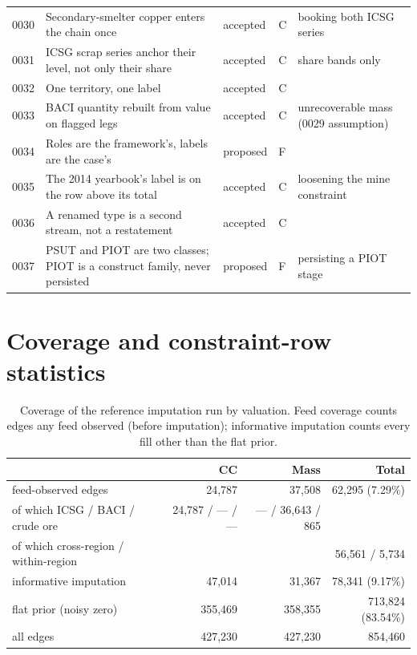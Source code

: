 \documentclass[11pt]{article}
\begin{document}
\begin{longtable}{@{}p{0.9cm}p{7.6cm}p{2.9cm}p{0.5cm}p{2.9cm}@{}}
0030 & Secondary-smelter copper enters the chain once & accepted & C & booking both ICSG series \\
0031 & ICSG scrap series anchor their level, not only their share & accepted & C & share bands only \\
0032 & One territory, one label & accepted & C & \\
0033 & BACI quantity rebuilt from value on flagged legs & accepted & C & unrecoverable mass (0029 assumption) \\
0034 & Roles are the framework's, labels are the case's & proposed & F & \\
0035 & The 2014 yearbook's label is on the row above its total & accepted & C & loosening the mine constraint \\
0036 & A renamed type is a second stream, not a restatement & accepted & C & \\
0037 & PSUT and PIOT are two classes; PIOT is a construct family, never persisted & proposed & F & persisting a PIOT stage \\
\bottomrule
\end{longtable}

\section{Coverage and constraint-row statistics}\label{si:coverage}

\begin{table}[h]
\centering\small
\begin{tabular}{@{}lrrr@{}}
\toprule
& CC & Mass & Total \\
\midrule
feed-observed edges & 24{,}787 & 37{,}508 & 62{,}295 (7.29\%) \\
\quad of which ICSG / BACI / crude ore & 24{,}787 / --- / --- & --- / 36{,}643 / 865 & \\
\quad of which cross-region / within-region & & & 56{,}561 / 5{,}734 \\
informative imputation & 47{,}014 & 31{,}367 & 78{,}341 (9.17\%) \\
flat prior (noisy zero) & 355{,}469 & 358{,}355 & 713{,}824 (83.54\%) \\
\midrule
all edges & 427{,}230 & 427{,}230 & 854{,}460 \\
\bottomrule
\end{tabular}
\caption{Coverage of the reference imputation run by valuation. Feed
coverage counts edges any feed observed (before imputation); informative
imputation counts every fill other than the flat prior.}
\label{tab:si-coverage}
\end{table}
\end{document}
